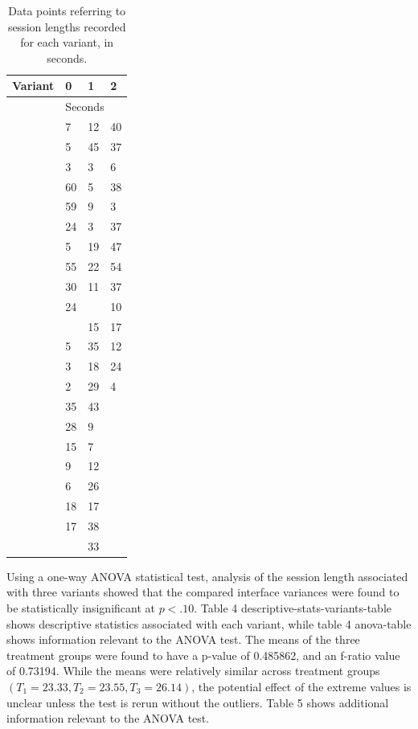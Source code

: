 \documentclass[conference]{IEEEtran}
\begin{document}
\begin{table}[]
\caption{Data points referring to session lengths recorded for each variant, in seconds.}
\label{tab:my-table}
\begin{tabular}{@{}llll@{}}
\toprule
Variant & 0    & 1    & 2   \\ \midrule
    & \multicolumn{3}{l}{Seconds} \\ \cmidrule(l){2-4} 
    & 7    & 12    & 40   \\
    & 5    & 45    & 37   \\
    & 3    & 3    & 6   \\
    & 60   & 5    & 38   \\
    & 59   & 9    & 3   \\
    & 24   & 3    & 37   \\
    & 5    & 19    & 47   \\
    & 55   & 22    & 54   \\
    & 30   & 11    & 37   \\
    & 24   & \B 107   & 10   \\
    & \B 80   & 15    & 17   \\
    & 5    & 35    & 12   \\
    & 3    & 18    & 24   \\
    & 2    & 29    & 4   \\
    & 35   & 43    &    \\
    & 28   & 9    &    \\
    & 15   & 7    &    \\
    & 9    & 12    &    \\
    & 6    & 26    &    \\
    & 18   & 17    &    \\
    & 17   & 38    &    \\
    &     & 33    &    \\ \bottomrule
\end{tabular}
\end{table}

Using a one-way ANOVA statistical test, analysis of the session length associated with three variants showed that the compared interface variances were found to be statistically insignificant at \(p < .10\). Table 4 {descriptive-stats-variants-table} shows descriptive statistics associated with each variant, while table 4 {anova-table} shows information relevant to the ANOVA test. The means of the three treatment groups were found to have a p-value of 0.485862, and an f-ratio value of 0.73194. While the means were relatively similar across treatment groups \((T_1 = 23.33, T_2 = 23.55, T_3 = 26.14)\), the potential effect of the extreme values is unclear unless the test is rerun without the outliers. Table 5 shows additional information relevant to the ANOVA test.
\end{document}
